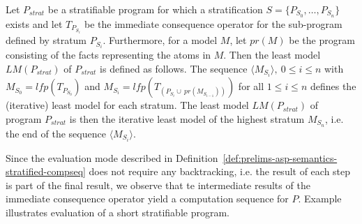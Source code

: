 \begin{definition}
\label{def:prelims-asp-semantics-stratified-compseq}
Let $P_{strat}$ be a stratifiable program for which a stratification $S = \{P_{S_0},\ldots,P_{S_n}\}$ exists and let $T_{P_{S_i}}$ be the immediate consequence operator for the sub-program defined by stratum $P_{S_i}$. Furthermore, for a model $M$, let $pr(M)$ be the program consisting of the facts representing the atoms in $M$.
Then the least model $LM(P_{strat})$ of $P_{strat}$ is defined as follows.
The sequence $\langle M_{S_i} \rangle,\ 0 \leq i \leq n$ with $M_{S_0} = \mathit{lfp}(T_{P_{S_0}})$ and $M_{S_i} = \mathit{lfp}(T_{(P_{S_{i}} \cup\ pr(M_{S_{i-1}}))})$ for all $1 \leq i \leq n$ defines the (iterative) least model for each stratum. The least model $LM(P_{strat})$ of program $P_{strat}$ is then the iterative least model of the highest stratum $M_{S_n}$, i.e. the end of the sequence $\langle M_{S_i} \rangle$.
\end{definition}

Since the evaluation mode described in Definition~\ref{def:prelims-asp-semantics-stratified-compseq} does not require any backtracking, i.e. the result of each step is part of the final result, we observe that te intermediate results of the immediate consequence operator yield a computation sequence for $P$. Example~ illustrates evaluation of a short stratifiable program.

